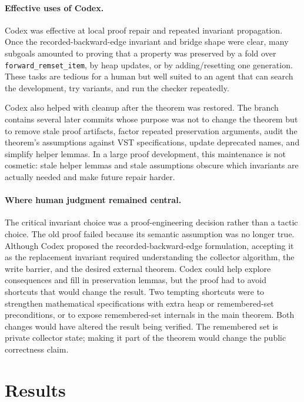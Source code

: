 \documentclass[acmsmall,nonacm]{acmart}
\newcommand{\VST}{VST}
\begin{document}
\paragraph{Effective uses of Codex.}
Codex was effective at local proof repair and repeated invariant propagation.
Once the recorded-backward-edge invariant and bridge shape were clear, many
subgoals amounted to proving that a property was preserved by a fold over
\texttt{forward\_remset\_item}, by heap updates, or by adding/resetting one
generation.  These tasks are tedious for a human but well suited to an agent
that can search the development, try variants, and run the checker repeatedly.

Codex also helped with cleanup after the theorem was restored.  The branch
contains several later commits whose purpose was not to change the theorem but
to remove stale proof artifacts, factor repeated preservation arguments, audit
the theorem's assumptions against \VST{} specifications, update deprecated
names, and simplify helper lemmas.  In a large proof development, this
maintenance is not cosmetic: stale helper lemmas and stale assumptions obscure
which invariants are actually needed and make future repair harder.

\paragraph{Where human judgment remained central.}
The critical invariant choice was a proof-engineering decision rather than a
tactic choice.  The old proof failed because its semantic assumption was no
longer true.  Although Codex proposed the recorded-backward-edge formulation,
accepting it as the replacement invariant required understanding the collector
algorithm, the write barrier, and the desired external theorem.  Codex could help
explore consequences and fill in preservation lemmas, but the proof had to avoid
shortcuts that would change the result.  Two tempting shortcuts were to
strengthen mathematical specifications with extra heap or remembered-set
preconditions, or to expose remembered-set internals in the main theorem.  Both
changes would have altered the result being verified.  The remembered set is
private collector state; making it part of the theorem would change the public
correctness claim.

\section{Results}
\end{document}
